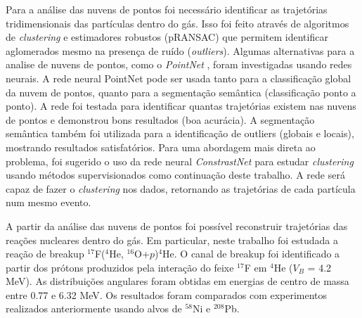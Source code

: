 \documentclass[a4paper,12pt,oneside]{book}
\begin{document}
\par Para a análise das nuvens de pontos foi necessário identificar as trajetórias tridimensionais das partículas dentro do gás. Isso foi feito através de algoritmos de \textit{clustering} e estimadores robustos (pRANSAC) \cite{artigo} que permitem identificar aglomerados mesmo na presença de ruído (\textit{outliers}). Algumas alternativas para a analise de nuvens de pontos, como o \textit{PointNet} \cite{qi2016pointnet}, foram investigadas usando redes neurais. A rede neural PointNet pode ser usada tanto para a classificação global da nuvem de pontos, quanto para a segmentação semântica (classificação ponto a ponto). A rede foi testada para identificar quantas trajetórias existem nas nuvens de pontos e demonstrou bons resultados (boa acurácia). A segmentação semântica também foi utilizada para a identificação de outliers (globais e locais), mostrando resultados satisfatórios. Para uma abordagem mais direta ao problema, foi sugerido o uso da rede neural \textit{ConstrastNet} \cite{contrastnet} para estudar \textit{clustering} usando métodos supervisionados como continuação deste trabalho. A rede será capaz de fazer o \textit{clustering} nos dados, retornando as trajetórias de cada partícula num mesmo evento.

\par A partir da análise das nuvens de pontos foi possível reconstruir trajetórias das reações nucleares dentro do gás. Em particular, neste trabalho foi estudada a reação de breakup $^{17}$F($^{4}$He, $^{16}$O+$p$)$^{4}$He. O canal de breakup foi identificado a partir dos prótons produzidos pela interação do feixe $^{17}$F em $^{4}$He ($V_B$ = 4.2 MeV). As distribuições angulares foram obtidas em energias de centro de massa entre 0.77 e 6.32 MeV. Os resultados foram comparados com experimentos realizados anteriormente  usando alvos de $^{58}$Ni e $^{208}$Pb. 

\end{document}
